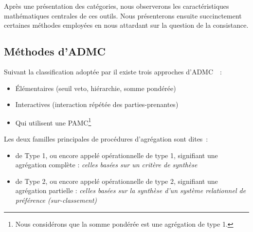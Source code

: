 Après une présentation des catégories, nous observerons les caractéristiques mathématiques centrales de ces outils. Nous présenterons ensuite succinctement certaines méthodes employées en nous attardant sur la question de la consistance.
\subsection{Méthodes d'ADMC}
% 
%	

Suivant la classification adoptée par \citeauthor{rowley_aggregating_2012} il existe trois approches d'ADMC~\cite{rowley_aggregating_2012}~:
\begin{itemize}
\item Élémentaires (seuil veto, hiérarchie, somme pondérée)
\item Interactives (interaction répétée des parties-prenantes)
\item Qui utilisent une \gls{PAMC}\footnote{Nous considérons que la somme pondérée est une agrégation de type 1.}
\end{itemize}
Les deux familles principales de procédures d'agrégation sont dites~:
\begin{itemize}
\item de Type 1, ou encore appelé opérationnelle de type 1, signifiant une agrégation complète : \emph{celles basées sur un critère de synthèse}
\item de Type 2, ou encore appelé opérationnelle de type 2, signifiant une agrégation partielle : \emph{celles basées sur la synthèse d'un système relationnel de préférence (sur-classement)}
\end{itemize}


